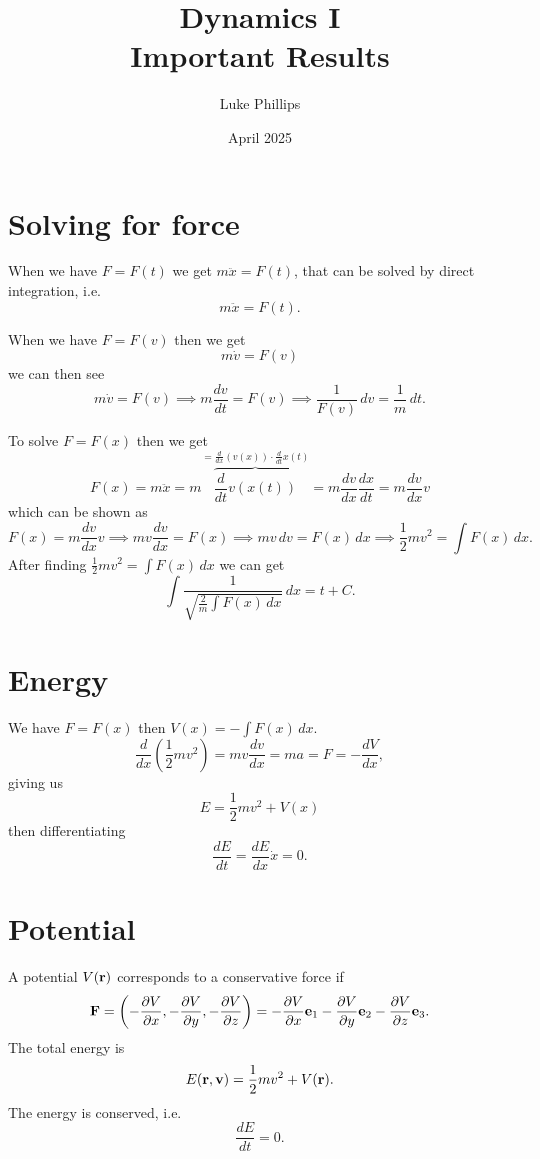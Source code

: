 \documentclass[10pt, a4paper]{article}
\title{Dynamics I \\
    \large Important Results}
\author{Luke Phillips}
\date{April 2025}
\begin{document}
\maketitle

\newpage

\tableofcontents

\newpage

\section{Solving for force}
When we have $F = F(t)$ we get $m\ddot{x} = F(t)$,
that can be solved by direct integration,
i.e.
\[
m\ddot{x} = F(t).
\]

When we have $F = F(v)$ then we get
\[
m\dot{v} = F(v)
\]
we can then see
\[
m\dot{v} = F(v) \implies m\frac{dv}{dt} = F(v) \implies \frac{1}{F(v)}\,dv = \frac{1}{m}\,dt.
\]

To solve $F = F(x)$ then we get
\[
F(x) =m\ddot{x} = m\overbrace{\frac{d}{dt}v(x(t))}^{= \frac{d}{dx}(v(x))\cdot\frac{d}{dt}x(t)} = m\frac{dv}{dx}\frac{dx}{dt} = m\frac{dv}{dx}v
\]
which can be shown as
\[
F(x) = m\frac{dv}{dx}v \implies mv\frac{dv}{dx} = F(x) \implies mv\,dv = F(x)\,dx \implies \frac{1}{2}mv ^ 2 = \int F(x)\,dx.
\]
After finding $\frac{1}{2}mv ^ 2 = \int F(x)\,dx$ we can get
\[
\int\frac{1}{\sqrt{\frac{2}{m}\int F(x)\,dx}}\,dx = t + C.
\]

\newpage

\section{Energy}
We have $F = F(x)$ then $V(x) = -\int F(x)\,dx$.
\[
\frac{d}{dx}\left(\frac{1}{2}mv ^ 2\right) = mv\frac{dv}{dx} = ma = F = -\frac{dV}{dx},
\]
giving us
\[
E = \frac{1}{2}mv ^ 2 + V(x)
\]
then differentiating
\[
\frac{dE}{dt} = \frac{dE}{dx}\dot{x} = 0.
\]

\newpage

\section{Potential}

A potential $V(\mbf{r})$ corresponds to a conservative force if
\[
\mbf{F} = \left(-\pd[V]{x}, -\pd[V]{y}, -\pd[V]{z}\right) = -\pd[V]{x}\mbf{e}_1 - \pd[V]{y}\mbf{e}_2 - \pd[V]{z}\mbf{e}_3.
\]
The total energy is
\[
E(\mbf{r}, \mbf{v}) = \frac{1}{2}mv ^ 2 + V(\mbf{r}).
\]
The energy is conserved,
i.e.
\[
\frac{dE}{dt} = 0.
\]
\end{document}
